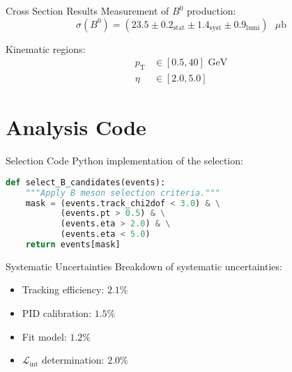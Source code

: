 \documentclass{me_beamer}
\begin{document}
\begin{frame}{Cross Section Results}
    Measurement of $B^0$ production:
    \[
        \sigma(B^0) = (23.5 \pm 0.2_{\text{stat}} \pm 1.4_{\text{syst}} \pm 0.9_{\text{lumi}})\text{ }\mu\text{b}
    \]
    
    \vspace{0.3cm}
    Kinematic regions:
    \begin{align*}
        p_{\text{T}} &\in [0.5, 40]\text{ GeV} \\
        \eta &\in [2.0, 5.0]
    \end{align*}
\end{frame}

\section{Analysis Code}

\begin{frame}[fragile]{Selection Code}
    Python implementation of the selection:
    \begin{lstlisting}[language=Python]
def select_B_candidates(events):
    """Apply B meson selection criteria."""
    mask = (events.track_chi2dof < 3.0) & \
           (events.pt > 0.5) & \
           (events.eta > 2.0) & \
           (events.eta < 5.0)
    return events[mask]
    \end{lstlisting}
\end{frame}

\startbackup

\begin{frame}{Systematic Uncertainties}
    Breakdown of systematic uncertainties:
    \begin{itemize}
        \item Tracking efficiency: $2.1\%$
        \item PID calibration: $1.5\%$
        \item Fit model: $1.2\%$
        \item $\mathcal{L}_{\text{int}}$ determination: $2.0\%$
    \end{itemize}
\end{frame}
\end{document}
